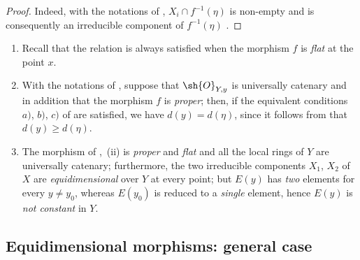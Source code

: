 \begin{proof}
Indeed, with the notations of , $X_i\cap f^{-1}(\eta)$ is non-empty and is consequently an irreducible component of $f^{-1}(\eta)$ .
\end{proof}

\begin{remarks}[13.2.12]
\label{IV.13.2.12}
\begin{enumerate}[label=(\roman*)]
  \item Recall  that the relation  is always satisfied when the morphism $f$ is \emph{flat} at the point $x$.
  \item With the notations of , suppose that $\sh{O}_{Y,y}$ is universally catenary and in addition that the morphism $f$ is \emph{proper}; then, if the equivalent conditions $a)$, $b)$, $c)$ of  are satisfied, we have $d(y)=d(\eta)$, since it follows from  that $d(y)\geq d(\eta)$.
  \item The morphism of ,~(ii) is \emph{proper} and \emph{flat} and all the local rings of $Y$ are universally catenary; furthermore, the two irreducible components $X_1$, $X_2$ of $X$ are \emph{equidimensional} over $Y$ at every point; but $E(y)$ has \emph{two} elements for every $y\neq y_0$, whereas $E(y_0)$ is reduced to a \emph{single} element, hence $E(y)$ is \emph{not constant} in $Y$.
\end{enumerate}
\end{remarks}

\subsection{Equidimensional morphisms: general case}
\label{subsection:IV.13.3}


